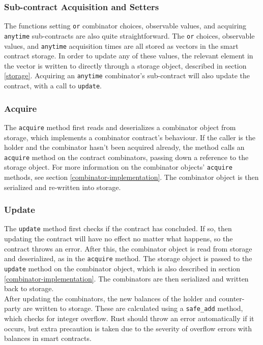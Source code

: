 \subsubsection{Sub-contract Acquisition and Setters}

The functions setting \texttt{or} combinator choices, observable values, and acquiring \texttt{anytime} sub-cont\-racts are also quite straightforward. The \texttt{or} choices, observable values, and \texttt{anytime} acquisition times are all stored as vectors in the smart contract storage. In order to update any of these values, the relevant element in the vector is written to directly through a storage object, described in section \ref{storage}. Acquiring an \texttt{anytime} combinator's sub-contract will also update the contract, with a call to \texttt{update}.


\subsubsection{Acquire}

The \texttt{acquire} method first reads and deserializes a combinator object from storage, which implements a combinator contract's behaviour. If the caller is the holder and the combinator hasn't been acquired already, the method calls an \texttt{acquire} method on the contract combinators, passing down a reference to the storage object. For more information on the combinator objects' \texttt{acquire} methods, see section \ref{combinator-implementation}. The combinator object is then serialized and re-written into storage.


\subsubsection{Update}

The \texttt{update} method first checks if the contract has concluded. If so, then updating the contract will have no effect no matter what happens, so the contract throws an error. After this, the combinator object is read from storage and deserialized, as in the \texttt{acquire} method. The storage object is passed to the \texttt{update} method on the combinator object, which is also described in section \ref{combinator-implementation}. The combinators are then serialized and written back to storage. \\

After updating the combinators, the new balances of the holder and counter-party are written to storage. These are calculated using a \texttt{safe\_add} method, which checks for integer overflow. Rust should throw an error automatically if it occurs, but extra precaution is taken due to the severity of overflow errors with balances in smart contracts.


